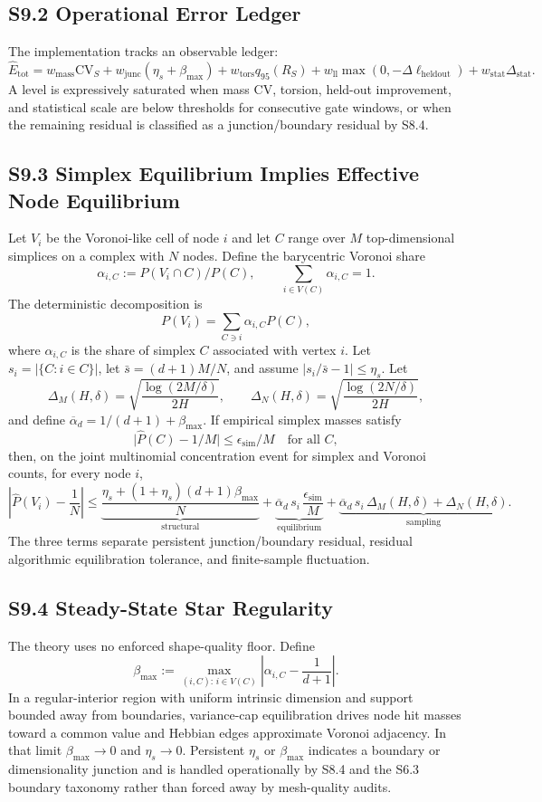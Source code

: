 \documentclass[11pt]{article}
\begin{document}
\subsection*{S9.2 Operational Error Ledger}
The implementation tracks an observable ledger:
\[
\widehat E_{\mathrm{tot}}
=w_{\mathrm{mass}}\mathrm{CV}_S
+w_{\mathrm{junc}}(\eta_s+\beta_{\max})
+w_{\mathrm{tors}}q_{95}(R_S)
+w_{\mathrm{ll}}\max(0,-\Delta\ell_{\mathrm{heldout}})
+w_{\mathrm{stat}}\Delta_{\mathrm{stat}}.
\]
A level is expressively saturated when mass CV, torsion, held-out improvement, and statistical scale are below thresholds for consecutive gate windows, or when the remaining residual is classified as a junction/boundary residual by S8.4.

\subsection*{S9.3 Simplex Equilibrium Implies Effective Node Equilibrium}
\label{sec:si-simplex-node-correspondence}
Let $V_i$ be the Voronoi-like cell of node $i$ and let $C$ range over $M$ top-dimensional simplices on a complex with $N$ nodes. Define the barycentric Voronoi share
\[
\alpha_{i,C}:=P(V_i\cap C)/P(C),
\qquad
\sum_{i\in V(C)}\alpha_{i,C}=1.
\]
The deterministic decomposition is
\[
P(V_i)=\sum_{C\ni i}\alpha_{i,C}P(C),
\]
where $\alpha_{i,C}$ is the share of simplex $C$ associated with vertex $i$. Let $s_i=|\{C:i\in C\}|$, let $\bar s=(d+1)M/N$, and assume $|s_i/\bar s-1|\le\eta_s$. Let
\[
\Delta_M(H,\delta)=\sqrt{\frac{\log(2M/\delta)}{2H}},
\qquad
\Delta_N(H,\delta)=\sqrt{\frac{\log(2N/\delta)}{2H}},
\]
and define $\overline\alpha_d=1/(d+1)+\beta_{\max}$. If empirical simplex masses satisfy
\[
\big|\hat P(C)-1/M\big|\le \epsilon_{\mathrm{sim}}/M
\quad\text{for all }C,
\]
then, on the joint multinomial concentration event for simplex and Voronoi counts, for every node $i$,
\[
\left|\hat P(V_i)-\frac1N\right|
\le
\underbrace{\frac{\eta_s+(1+\eta_s)(d+1)\beta_{\max}}{N}}_{\mathrm{structural}}
+
\underbrace{\overline\alpha_d\,s_i\,\frac{\epsilon_{\mathrm{sim}}}{M}}_{\mathrm{equilibrium}}
+
\underbrace{\overline\alpha_d\,s_i\,\Delta_M(H,\delta)+\Delta_N(H,\delta)}_{\mathrm{sampling}}.
\label{eq:si-simplex-node-bound}
\]
The three terms separate persistent junction/boundary residual, residual algorithmic equilibration tolerance, and finite-sample fluctuation.

\subsection*{S9.4 Steady-State Star Regularity}
The theory uses no enforced shape-quality floor. Define
\[
\beta_{\max}
:=
\max_{(i,C):\,i\in V(C)}
\left|\alpha_{i,C}-\frac{1}{d+1}\right|.
\]
In a regular-interior region with uniform intrinsic dimension and support bounded away from boundaries, variance-cap equilibration drives node hit masses toward a common value and Hebbian edges approximate Voronoi adjacency. In that limit $\beta_{\max}\to0$ and $\eta_s\to0$. Persistent $\eta_s$ or $\beta_{\max}$ indicates a boundary or dimensionality junction and is handled operationally by S8.4 and the S6.3 boundary taxonomy rather than forced away by mesh-quality audits.
\end{document}
